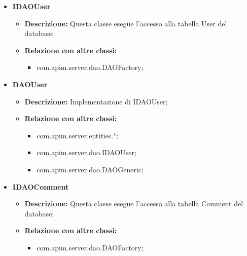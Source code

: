 {{{{{\begin{itemize}
\begin{itemize}
            \begin{itemize}
              \item com.apim.server.entities.*;
              \item com.apim.server.dao.IDAOAPI;
              \item com.apim.server.dao.DAOGeneric;
            \end{itemize}
          \end{itemize}
          \item \textbf{IDAOUser}
          \begin{itemize}
            \item \textbf{Descrizione:} Questa classe esegue l'accesso alla tabella User del database;
            \item \textbf{Relazione con altre classi:}
            \begin{itemize}
              \item com.apim.server.dao.DAOFactory;
            \end{itemize}
          \end{itemize}
          \item \textbf{DAOUser}
          \begin{itemize}
            \item \textbf{Descrizione:} Implementazione di IDAOUser;
            \item \textbf{Relazione con altre classi:}
            \begin{itemize}
              \item com.apim.server.entities.*;
              \item com.apim.server.dao.IDAOUser;
              \item com.apim.server.dao.DAOGeneric;
            \end{itemize}
          \end{itemize}
          \item \textbf{IDAOComment}
          \begin{itemize}
            \item \textbf{Descrizione:} Questa classe esegue l'accesso alla tabella Comment del database;
            \item \textbf{Relazione con altre classi:}
            \begin{itemize}
              \item com.apim.server.dao.DAOFactory;
            \end{itemize}
          \end{itemize}

\end{itemize}}}}}}
